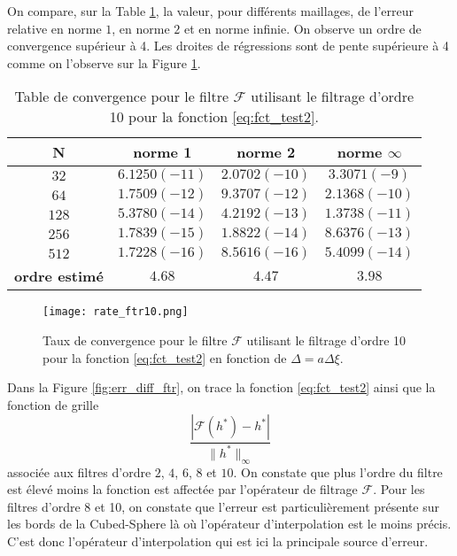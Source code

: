 On compare, sur la Table \ref{tab:rate_ftr10}, la valeur, pour différents maillages, de l'erreur relative en norme $1$, en norme $2$ et en norme infinie. On observe un ordre de convergence supérieur à 4. Les droites de régressions sont de pente supérieure à 4 comme on l'observe sur la Figure \ref{fig:rate_ftr10}.

\begin{table}[htbp]
\begin{center}
\begin{tabular}{|c||c|c|c|}
\hline
\textbf{N}  & \textbf{norme 1} & \textbf{norme 2} & \textbf{norme $\infty$} \\
\hline
\hline
$32$ & $6.1250(-11)$  & $2.0702(-10)$  & $3.3071(-9)$  \\
$64$ & $1.7509(-12)$  & $9.3707(-12)$  & $2.1368(-10)$  \\
$128$& $5.3780(-14)$  & $4.2192(-13)$  & $1.3738(-11)$  \\
$256$& $1.7839(-15)$  & $1.8822(-14)$  & $8.6376(-13)$  \\
$512$& $1.7228(-16)$  & $8.5616(-16)$  & $5.4099(-14)$  \\
\hline
\hline
\textbf{ordre estimé}& $4.68$ & $4.47$ & $3.98$\\
\hline
\end{tabular}
\end{center}
\caption{Table de convergence pour le filtre $\mathcal{F}$ utilisant le filtrage d'ordre 10 pour la fonction \eqref{eq:fct_test2}.}
\label{tab:rate_ftr10}
\end{table} 

\begin{figure}[htbp]
\begin{center}
\texttt{[image: rate\_ftr10.png]}
\end{center}
\caption{Taux de convergence pour le filtre $\mathcal{F}$ utilisant le filtrage d'ordre 10 pour la fonction \eqref{eq:fct_test2} en fonction de $\Delta = a \Delta \xi$.}
\label{fig:rate_ftr10}
\end{figure}

Dans la Figure \ref{fig:err_diff_ftr}, on trace la fonction \eqref{eq:fct_test2} ainsi que la fonction de grille
\begin{equation}
\dfrac{|\mathcal{F}(h^*) - h^*|}{\| h^* \|_{\infty}}
\label{eq:ftr_err}
\end{equation}
associée aux filtres d'ordre $2$, $4$, $6$, $8$ et $10$. On constate que plus l'ordre du filtre est élevé moins la fonction est affectée par l'opérateur de filtrage $\mathcal{F}$. Pour les filtres d'ordre 8 et 10, on constate que l'erreur est particulièrement présente sur les bords de la Cubed-Sphere là où l'opérateur d'interpolation est le moins précis. C'est donc l'opérateur d'interpolation qui est ici la principale source d'erreur.

